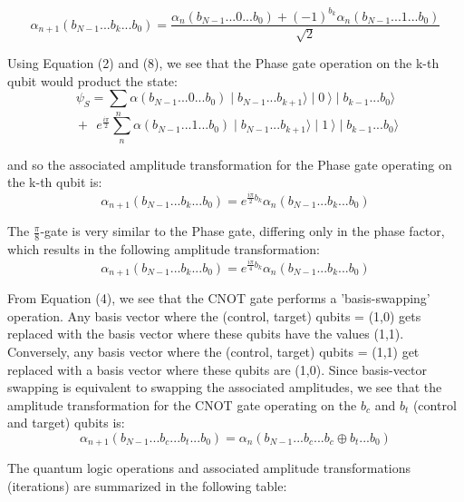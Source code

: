 \documentclass[reqno]{amsart}
\theoremstyle{definition}
\theoremstyle{remark}
\begin{document}
\begin{equation}
\alpha_{n+1}(b_{N-1}...b_k...b_0)=\frac{\alpha_{n}(b_{N-1}...0...b_{0})+(-1)^{b_k} \alpha_{n}(b_{N-1}...1...b_{0})}{\sqrt{2}}
\end{equation}

\noindent
Using Equation (2) and (8), we see that the Phase gate operation on the k-th qubit would product the state:
\begin{equation}
\psi_S=\sum_{n} \alpha(b_{N-1}...0...b_{0})\mid b_{N-1}...b_{k+1}\rangle\mid0\:\rangle\mid b_{k-1}...b_{0}\rangle 
\end{equation}
$$
\: + \:\:e^{ \frac{i\pi}{2}}\sum_{n} \alpha(b_{N-1}...1...b_{0})\mid b_{N-1}...b_{k+1}\rangle\mid1\:\rangle\mid b_{k-1}...b_{0}\rangle
$$ 

\noindent
and so the associated amplitude transformation for the Phase gate operating on the k-th qubit is:
\begin{equation}
\alpha_{n+1}(b_{N-1}...b_k...b_0)=e^{ \frac{i\pi}{2} b_k}\alpha_{n}(b_{N-1}...b_k...b_0)
\end{equation}

\noindent
The $\frac{\pi}{8}$-gate is very similar to the Phase gate, differing only in the phase factor, which
results in the following amplitude transformation:
\begin{equation}
\alpha_{n+1}(b_{N-1}...b_k...b_0)=e^{ \frac{i\pi}{4} b_k}\alpha_{n}(b_{N-1}...b_k...b_0)
\end{equation}
 

\noindent
From Equation (4), we see that the CNOT gate performs a 'basis-swapping' operation. Any basis vector where the (control, target) qubits = (1,0) gets replaced with the basis vector where these qubits have the values (1,1). Conversely, any basis vector where the (control, target) qubits = (1,1) get replaced with a basis vector where these qubits are (1,0). Since basis-vector swapping is equivalent to swapping the associated amplitudes, we see that the amplitude transformation for the CNOT gate operating on the $b_c$ and $b_t$ (control and target) qubits is:
\begin{equation}
\alpha_{n+1}(b_{N-1}...b_c...b_t...b_0)=\alpha_{n}(b_{N-1}...b_c...b_c\oplus b_t...b_0)
\end{equation}

\noindent
The quantum logic operations and associated amplitude transformations (iterations) are summarized in the following table:
\end{document}
